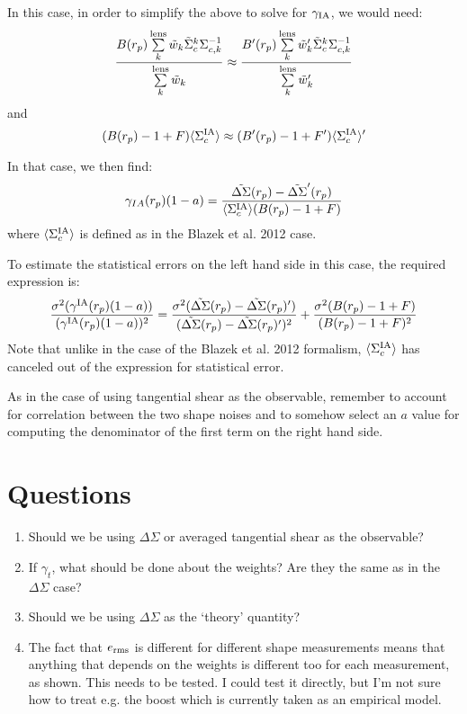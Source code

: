 \documentclass[onecolumn,amsmath,aps,fleqn, superscriptaddress]{revtex4}
\begin{document}
In this case, in order to simplify the above to solve for $\gamma_{\rm IA}$, we would need:
\begin{equation}
\frac{B(r_p) \sum\limits_{k}^{\rm lens} \tilde{w}_k \tilde{\Sigma}_c^k\Sigma_{c,k}^{-1}}{\sum\limits_{k}^{\rm lens} \tilde{w}_k} \approx \frac{B^\prime(r_p) \sum\limits_{k}^{\rm lens} \tilde{w}^\prime_k \tilde{\Sigma}_c^k\Sigma_{c,k}^{-1}}{\sum\limits_{k}^{\rm lens} \tilde{w}^\prime_k}
\label{lens_req_DS}
\end{equation}
and
\begin{equation}
(B(r_p)-1+F)\langle \Sigma_c^{\rm IA} \rangle\approx (B^\prime(r_p)-1+F^\prime)\langle \Sigma_c ^{\rm IA}\rangle^\prime
\label{ia_req_DS}
\end{equation}

In that case, we then find:
\begin{equation}
\gamma_{IA}(r_p)(1-a) = \frac{\tilde{\Delta \Sigma}(r_p) - \tilde{\Delta \Sigma}'(r_p)}{\langle \Sigma_c^{\rm IA}\rangle (B(r_p)-1+F)}
\label{gammaIA_sol_DS}
\end{equation}
where $\langle \Sigma_c^{\rm IA}\rangle$ is defined as in the Blazek et al. 2012 case.

To estimate the statistical errors on the left hand side in this case, the required expression is:
\begin{equation}
\frac{\sigma^2(\gamma^{\rm IA}(r_p)(1-a))}{(\gamma^{\rm IA}(r_p)(1-a))^2} = \frac{\sigma^2(\tilde{\Delta \Sigma}(r_p) - \tilde{\Delta \Sigma}(r_p)^\prime)}{(\tilde{\Delta \Sigma}(r_p) - \tilde{\Delta \Sigma}(r_p)^\prime)^2} + \frac{\sigma^2(B(r_p)-1+F)}{(B(r_p)-1+F)^2}
\label{error_DS}
\end{equation}
Note that unlike in the case of the Blazek et al. 2012 formalism, $\langle \Sigma_c^{\rm IA}\rangle$ has canceled out of the expression for statistical error. 

As in the case of using tangential shear as the observable, remember to account for correlation between the two shape noises and to somehow select an $a$ value for computing the denominator of the first term on the right hand side.

\section*{Questions}
\begin{enumerate}
\item{Should we be using $\Delta \Sigma$ or averaged tangential shear as the observable?}
\item{If $\gamma_t$, what should be done about the weights? Are they the same as in the $\Delta \Sigma$ case?}
\item{Should we be using $\Delta\Sigma$ as the `theory' quantity?}
\item{The fact that $e_{\rm rms}$ is different for different shape measurements means that anything that depends on the weights is different too for each measurement, as shown. This needs to be tested. I could test it directly, but I'm not sure how to treat e.g. the boost which is currently taken as an empirical model.}
\end{enumerate}


\end{document}
